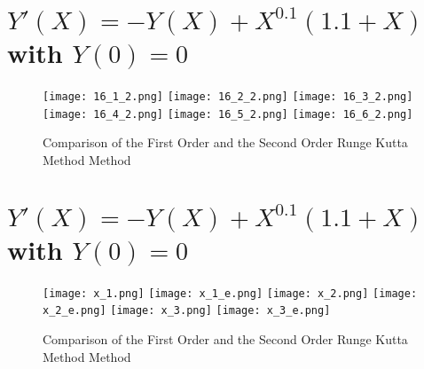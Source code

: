 \documentclass{article}
\begin{document}
\newpage
\section{$Y'(X) = -Y(X) + X^{0.1}(1.1+X)$ with $Y(0) = 0$}
\begin{figure}[!h]
    \centering
    \texttt{[image: 16\_1\_2.png]}
    \texttt{[image: 16\_2\_2.png]}
    \texttt{[image: 16\_3\_2.png]}
    \texttt{[image: 16\_4\_2.png]}
    \texttt{[image: 16\_5\_2.png]}
    \texttt{[image: 16\_6\_2.png]}
    \caption{Comparison of the First Order and the Second Order Runge Kutta Method Method}
\end{figure}

\newpage
\section{$Y'(X) = -Y(X) + X^{0.1}(1.1+X)$ with $Y(0) = 0$}
\begin{figure}[!h]
    \centering
    \texttt{[image: x\_1.png]}
    \texttt{[image: x\_1\_e.png]}
    \texttt{[image: x\_2.png]}
    \texttt{[image: x\_2\_e.png]}
    \texttt{[image: x\_3.png]}
    \texttt{[image: x\_3\_e.png]}
    \caption{Comparison of the First Order and the Second Order Runge Kutta Method Method}
\end{figure}
\end{document}
